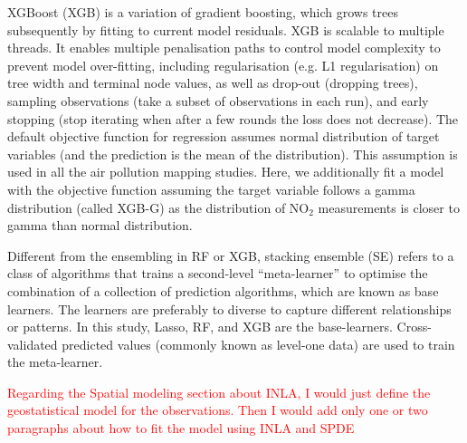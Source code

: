 \documentclass{article}
\begin{document}
XGBoost (XGB) is a variation of gradient boosting, which grows trees subsequently by fitting to current model residuals. XGB is scalable to multiple threads. It enables multiple penalisation paths to control model complexity to prevent model over-fitting, including regularisation (e.g. L1 regularisation) on tree width and terminal node values, as well as drop-out (dropping trees), sampling observations (take a subset of observations in each run), and early stopping (stop iterating when after a few rounds the loss does not decrease). The default objective function for regression assumes normal distribution of target variables (and the prediction is the mean of the distribution). This assumption is used in all the air pollution mapping studies. Here, we additionally fit a model with the objective function assuming the target variable follows a gamma distribution (called XGB-G) as the distribution of NO$_2$ measurements is closer to gamma than normal distribution.  

Different from the ensembling in RF or XGB, stacking ensemble (SE) refers to a class of algorithms that trains a second-level “meta-learner” to optimise the combination of a collection of prediction algorithms, which are known as base learners.  The learners are preferably to diverse to capture different relationships or patterns. In this study, Lasso, RF, and XGB are the base-learners. Cross-validated predicted values (commonly known as level-one data) are used to train the meta-learner. 


\textcolor{red}{Regarding the Spatial modeling section about INLA, I would just define the geostatistical model for the observations. Then I would add only one or two paragraphs about how to fit the model using INLA and SPDE}

 



\end{document}
